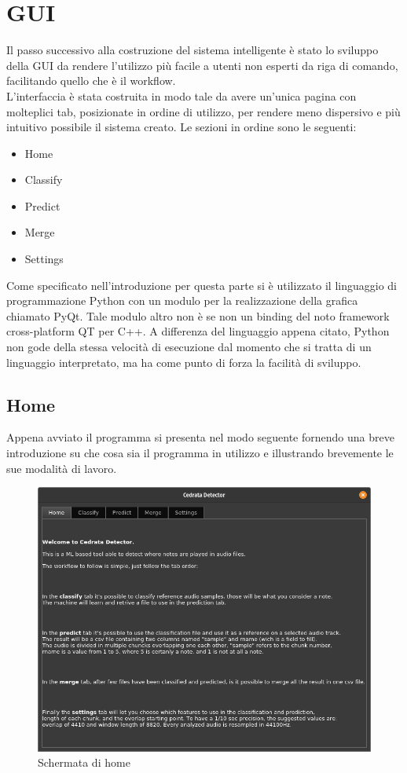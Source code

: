 \chapter{GUI}
Il passo successivo alla costruzione del sistema intelligente è stato lo sviluppo della GUI da rendere l'utilizzo più facile a utenti non esperti da riga di comando, facilitando quello che è il workflow.\\
L'interfaccia è stata costruita in modo tale da avere un'unica pagina con molteplici tab, posizionate in ordine di utilizzo, per rendere meno dispersivo e più intuitivo possibile il sistema creato. Le sezioni in ordine sono le seguenti:
\begin{itemize}
	\item Home
	\item Classify
	\item Predict
	\item Merge
	\item Settings
\end{itemize}

Come specificato nell'introduzione per questa parte si è utilizzato il linguaggio di programmazione Python con un modulo per la realizzazione della grafica chiamato PyQt. Tale modulo altro non è se non un binding del noto framework cross-platform QT per C++. A differenza del linguaggio appena citato, Python non gode della stessa velocità di esecuzione dal momento che si tratta di un linguaggio interpretato, ma ha come punto di forza la facilità di sviluppo.

\section{Home}
Appena avviato il programma si presenta nel modo seguente fornendo una breve introduzione su che cosa sia il programma in utilizzo e illustrando brevemente le sue modalità di lavoro.
\begin{figure}[h!]
	\begin{center}
		\includegraphics[scale=0.5]{./immagini/gui/home.png}
	\end{center}
	\caption{Schermata di home}\label{fig:gui-home}
\end{figure}

